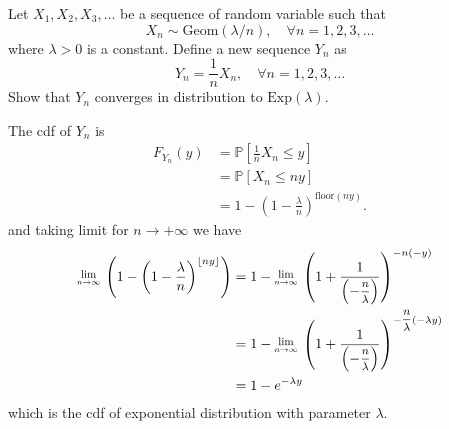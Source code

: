 \begin{example}
    Let $X_1, X_2, X_3, \ldots$ be a sequence of random variable such that 
    \[
        X_n \sim \text{Geom}(\lambda /n), \quad \forall n = 1,2,3,\ldots
    \]
    where $\lambda > 0$ is a constant. Define a new sequence $Y_n$ as 
    \[
        Y_n = \frac{1}{n}X_n, \quad \forall n = 1,2,3,\ldots
    \]
    Show that $Y_n$ converges in distribution to $\text{Exp}(\lambda)$.
\end{example}

\begin{solution}
    The cdf of $Y_n$ is 
    \begin{align*}
        F_{Y_n}(y) &= \mathbb{P}\left[ \frac{1}{n}X_n \leq y \right]\\
        &= \mathbb{P}\left[ X_n \leq ny \right]\\
        &= 1 - \left( 1- \frac{\lambda}{n} \right)^{\text{floor}(ny)}.
    \end{align*}
    and taking limit for $n \to +\infty$ we have 
    \begin{align*}
        \Lim{n \to \infty} \left( 1 - \left( 1- \frac{\lambda}{n} \right)^{\lfloor ny \rfloor } \right) 
        &= 1 - \Lim{n \to \infty} \left( 1 + \frac{1}{\left(-\mfrac{n}{\lambda} \right)} \right)^{-n(-y)}\\
        &= 1 - \Lim{n \to \infty} \left( 1 + \frac{1}{\left(-\mfrac{n}{\lambda}\right)} \right)^{-\mfrac{n}{\lambda}(-\lambda y)}\\
        &= 1 - e^{-\lambda y}
    \end{align*}
    which is the cdf of exponential distribution with parameter $\lambda$.
\end{solution}


